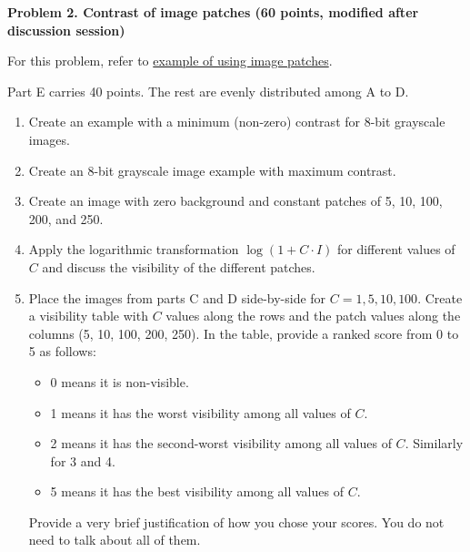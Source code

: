\documentclass[11pt]{article}
\begin{document}
	\newpage
	
	\noindent\textbf{Problem 2. Contrast of image patches (60 points, modified after discussion session)}
	
	For this problem, refer to 
	\href{https://colab.research.google.com/github/pattichis/AIML/blob/main/Session_8_Create_videos.ipynb#scrollTo=vhSh4F_an5j4}{example of using image patches}.
	
	Part E carries 40 points. The rest are evenly distributed among A to D.
	
	\begin{enumerate}[label=\textbf{\Alph*.}, leftmargin=1.2cm]
		
		\item Create an example with a minimum (non-zero) contrast for 8-bit grayscale images.
		
		\item Create an 8-bit grayscale image example with maximum contrast.
		
		\item Create an image with zero background and constant patches of 5, 10, 100, 200, and 250.
		
		\item Apply the logarithmic transformation $\log(1 + C \cdot I)$ for different values of $C$ and discuss the visibility of the different patches.
		
		\item Place the images from parts C and D side-by-side for $C=1, 5, 10, 100$. Create a visibility table with $C$ values along the rows and the patch values along the columns (5, 10, 100, 200, 250). In the table, provide a ranked score from 0 to 5 as follows:
		\begin{itemize}
			\item 0 means it is non-visible.
			\item 1 means it has the worst visibility among all values of $C$.
			\item 2 means it has the second-worst visibility among all values of $C$. Similarly for 3 and 4.
			\item 5 means it has the best visibility among all values of $C$.
		\end{itemize}
		
		Provide a very brief justification of how you chose your scores. You do not need to talk about all of them.
		
	\end{enumerate}
	
\end{document}
